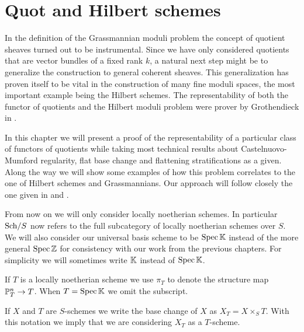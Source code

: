 \chapter{Quot and Hilbert schemes}
In the definition of the Grassmannian moduli problem the concept of quotient sheaves turned out to be instrumental. Since we have only considered quotients that are vector bundles of a fixed rank $k$, a natural next step might be to generalize the construction to general coherent sheaves. This generalization has proven itself to be vital in the construction of many fine moduli spaces, the most important example being the Hilbert schemes. The representability of both the functor of quotients and the Hilbert moduli problem were prover by Grothendieck in \cite{FGAVI}.

In this chapter we will present a proof of the representability of a particular class of functors of quotients while taking most technical results about Castelnuovo-Mumford regularity, flat base change and flattening stratifications as a given. Along the way we will show some examples of how this problem correlates to the one of Hilbert schemes and Grassmannians. Our approach will follow closely the one given in \cite{Alper} and \cite{FGAEXPLAINED}.\smallskip

From now on we will only consider locally noetherian schemes. In particular ${\mathrm{Sch}}/{S}$ now refers to the full subcategory of locally noetherian schemes over $S$. We will also consider our universal basis scheme to be $\mathrm{Spec}\, \mathbb{K}$ instead of the more general $\mathrm{Spec}\,\mathbb{Z}$ for consistency with our work from the previous chapters. For simplicity we will sometimes write $\mathbb{K}$ instead of $\mathrm{Spec}\, \mathbb{K}$.
\begin{notation}
If $T$ is a locally noetherian scheme we use $\pi_T$ to denote the structure map $\mathbb{P}^n_T\to T$. When $T=\mathrm{Spec}\,\mathbb{K}$ we omit the subscript.
\end{notation}

\begin{notation}
If $X$ and $T$ are $S$-schemes we write the base change of $X$ as $X_T=X\times_S T$. With this notation we imply that we are considering $X_T$ as a $T$-scheme.
\end{notation}


